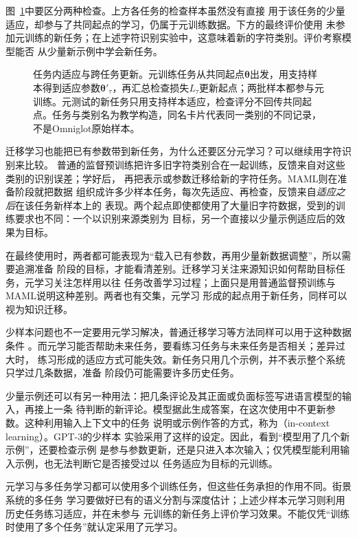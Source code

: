 图~\ref{fig:meta-learning-process}中要区分两种检查。上方各任务的检查样本虽然没有直接
用于该任务的少量适应，却参与了共同起点的学习，仍属于元训练数据。下方的最终评价使用
未参加元训练的新任务；在上述字符识别实验中，这意味着新的字符类别。评价考察模型能否
从少量新示例中学会新任务。

\begin{figure}[!t]
  \centering
  
  \caption{任务内适应与跨任务更新。元训练任务从共同起点$\bm\theta$出发，用支持样本得到适应参数$\bm\theta'_{\tau}$，再汇总检查损失$L_{\tau}$更新起点；两批样本都参与元训练。元测试的新任务只用支持样本适应，检查评分不回传共同起点。任务与类别名为教学构造，同名卡片代表同一类别的不同记录，不是Omniglot原始样本。}
  \label{fig:meta-learning-process}
\end{figure}

迁移学习也能把已有参数带到新任务，为什么还要区分元学习？可以继续用字符识别来比较。
普通的监督预训练把许多旧字符类别合在一起训练，反馈来自对这些类别的识别误差；学好后，
再把表示或参数迁移给新的字符任务。MAML则在准备阶段就把数据
组织成许多少样本任务，每次先适应、再检查，反馈来自\emph{适应之后}在该任务新样本上的
表现。两个起点即使都使用了大量旧字符数据，受到的训练要求也不同：一个以识别来源类别为
目标，另一个直接以少量示例适应后的效果为目标。

在最终使用时，两者都可能表现为“载入已有参数，再用少量新数据调整”，所以需要追溯准备
阶段的目标，才能看清差别。迁移学习关注来源知识如何帮助目标任务，元学习关注怎样用以往
任务改善学习过程；上面只是用普通监督预训练与MAML说明这种差别。两者也有交集，元学习
形成的起点用于新任务，同样可以视为知识迁移。

少样本问题也不一定要用元学习解决，普通迁移学习等方法同样可以用于这种数据条件
。而元学习能否帮助未来任务，要看练习任务与未来任务是否相关；差异过大时，
练习形成的适应方式可能失效。新任务只用几个示例，并不表示整个系统只学过几条数据，准备
阶段仍可能需要许多历史任务。

少量示例还可以有另一种用法：把几条评论及其正面或负面标签写进语言模型的输入，再接上一条
待判断的新评论。模型据此生成答案，在这次使用中不更新参数。这种利用输入上下文中的任务
说明或示例作答的方式，称为（in-context learning）。GPT-3的少样本
实验采用了这样的设定。因此，看到“模型用了几个新示例”，还要检查示例
是参与参数更新，还是只进入本次输入；仅凭模型能利用输入示例，也无法判断它是否接受过以
任务适应为目标的元训练。

元学习与多任务学习都可以使用多个训练任务，但这些任务承担的作用不同。街景系统的多任务
学习要做好已有的语义分割与深度估计；上述少样本元学习则利用历史任务练习适应，并在未参与
元训练的新任务上评价学习效果。不能仅凭“训练时使用了多个任务”就认定采用了元学习。

